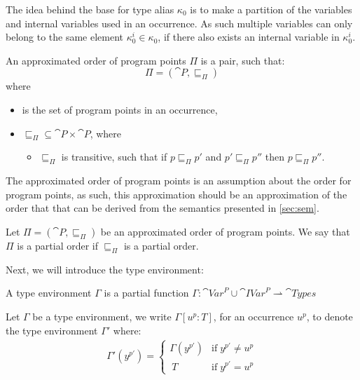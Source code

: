\documentclass[../../master.tex]{subfiles}
\begin{document}
The idea behind the base for type alias $\kappa_0$ is to make a partition of the variables and internal variables used in an occurrence.
As such multiple variables can only belong to the same element $\kappa_0^i\in\kappa_0$, if there also exists an internal variable in $\kappa_0^i$.

\begin{definition}
	An approximated order of program points $\Pi$ is a pair, such that: 
	$$\Pi=(\cat{P},\sqsubseteq_\Pi)$$
	where
	\begin{itemize}
		\item {} is the set of program points in an occurrence,
		\item $\sqsubseteq_\Pi\subseteq\cat{P}\times\cat{P}$, where
		\begin{itemize}
			\item $\sqsubseteq_\Pi$ is transitive, such that if $p\sqsubseteq_\Pi p'$ and $p'\sqsubseteq_\Pi p''$ then $p\sqsubseteq_\Pi p''$.
		\end{itemize}
	\end{itemize}
\end{definition}

The approximated order of program points is an assumption about the order for program points, as such, this approximation should be an approximation of the order that that can be derived from the semantics presented in \cref{sec:sem}.

\begin{definition}
	Let $\Pi=(\cat{P},\sqsubseteq_\Pi)$ be an approximated order of program points.
	We say that $\Pi$ is a partial order if $\sqsubseteq_\Pi$ is a partial order.
\end{definition}
\bigskip

Next, we will introduce the type environment:
\begin{definition}
	A type environment $\Gamma$ is a partial function $\Gamma:\cat{Var}^P\cup\cat{IVar}^P\rightharpoonup\cat{Types}$
\end{definition}

\begin{definition}
	Let $\Gamma$ be a type environment, we write $\Gamma[u^p:T]$, for an occurrence $u^p$, to denote the type environment $\Gamma'$ where:
	\begin{align*}
		\Gamma'(y^{p'})=
		\left\{\begin{matrix}
			\Gamma(y^{p'}) & \mbox{if}\;y^{p'}\neq u^{p}\\\	 
			T & \mbox{if}\;y^{p'}=u^{p}
		\end{matrix}\right.
	\end{align*}
\end{definition}
\end{document}
